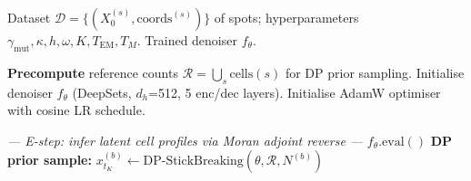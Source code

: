 \documentclass[11pt]{article}
\begin{document}
\begin{algorithm}[H]
\caption{Moran Bridge: EM Training (from data to denoiser checkpoint)}
\label{alg:train}
\begin{algorithmic}[1]
\Require Dataset $\mathcal{D} = \{(X_0^{(s)}, \text{coords}^{(s)})\}$ of spots; hyperparameters $\gamma_{\text{mut}}, \kappa, h, \omega, K, T_{\text{EM}}, T_M$.
\Ensure Trained denoiser $f_\theta$.

\State \textbf{Precompute} reference counts $\mathcal{R} = \bigcup_s \text{cells}(s)$ for DP prior sampling.
\State Initialise denoiser $f_\theta$ (DeepSets, $d_h$=512, 5 enc/dec layers).
\State Initialise AdamW optimiser with cosine LR schedule.


    \Statex \hfill\textit{--- E-step: infer latent cell profiles via Moran adjoint reverse ---}
    \State $f_\theta.\text{eval}()$
      \State \textbf{DP prior sample:} $x_{t_K}^{(b)} \leftarrow \text{DP-StickBreaking}(\theta, \mathcal{R}, N^{(b)})$
    \EndFor


\end{algorithmic}
\end{algorithm}
\end{document}
